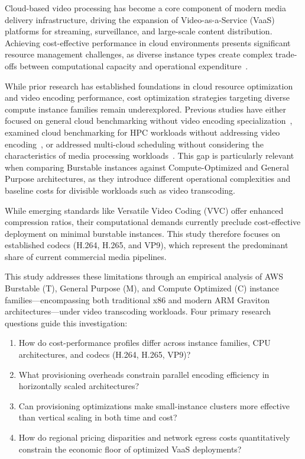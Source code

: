 \documentclass[conference]{IEEEtran}
\begin{document}
Cloud-based video processing has become a core component of modern media
delivery infrastructure, driving the expansion of Video-as-a-Service (VaaS)
platforms for streaming, surveillance, and large-scale content distribution.
Achieving cost-effective performance in cloud environments presents significant
resource management challenges, as diverse instance types create complex
trade-offs between computational capacity and operational
expenditure~\cite{b1,b17}.

While prior research has established foundations in cloud resource optimization
and video encoding performance, cost optimization strategies targeting diverse
compute instance families remain underexplored. Previous studies have either
focused on general cloud benchmarking without video encoding
specialization~\cite{b1}, examined cloud benchmarking for HPC workloads without addressing video encoding~\cite{b3}, or addressed multi-cloud scheduling without considering the
characteristics of media processing workloads~\cite{b20}. This gap is
particularly relevant when comparing Burstable instances against
Compute-Optimized and General Purpose architectures, as they introduce
different operational complexities and baseline costs for divisible workloads
such as video transcoding.

While emerging standards like Versatile Video Coding (VVC) offer enhanced
compression ratios, their computational demands currently preclude
cost-effective deployment on minimal burstable instances. This study therefore
focuses on established codecs (H.264, H.265, and VP9), which represent the
predominant share of current commercial media pipelines.

This study addresses these limitations through an empirical analysis of AWS Burstable (T), General Purpose (M), and Compute Optimized (C) instance families---encompassing both traditional x86 and modern ARM Graviton architectures---under video transcoding workloads. Four primary research questions guide this investigation:
\begin{enumerate}
\item[\textbf{RQ1.}] How do cost-performance profiles differ across instance families, CPU architectures, and codecs (H.264, H.265, VP9)?
\item[\textbf{RQ2.}] What provisioning overheads constrain parallel encoding efficiency in horizontally scaled architectures?
\item[\textbf{RQ3.}] Can provisioning optimizations make small-instance clusters more effective than vertical scaling in both time and cost?
\item[\textbf{RQ4.}] How do regional pricing disparities and network egress costs quantitatively constrain the economic floor of optimized VaaS deployments?
\end{enumerate}
\end{document}
